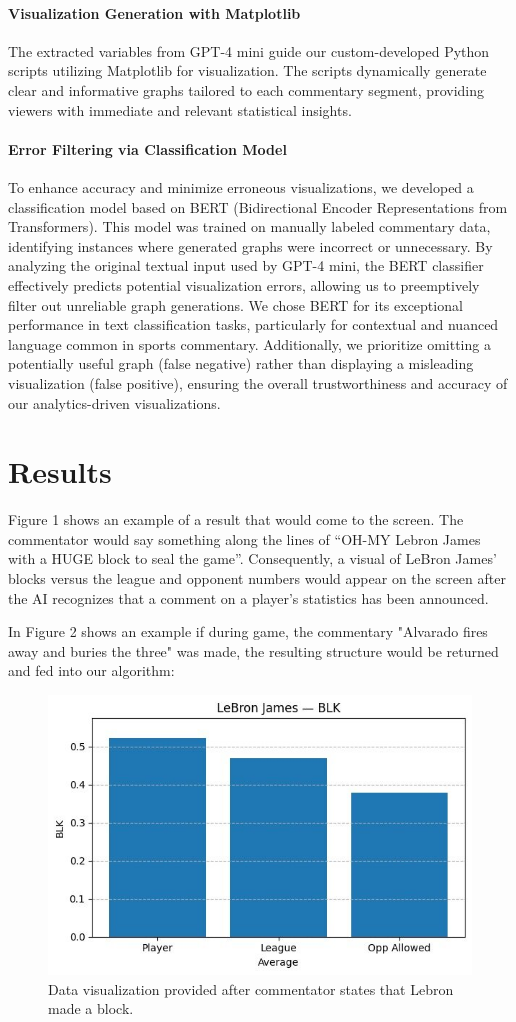 \documentclass{article}
\begin{document}
\paragraph{Visualization Generation with Matplotlib}
The extracted variables from GPT-4 mini guide our custom-developed Python scripts utilizing Matplotlib for visualization. The scripts dynamically generate clear and informative graphs tailored to each commentary segment, providing viewers with immediate and relevant statistical insights.

\paragraph{Error Filtering via Classification Model}
To enhance accuracy and minimize erroneous visualizations, we developed a classification model based on BERT (Bidirectional Encoder Representations from Transformers). This model was trained on manually labeled commentary data, identifying instances where generated graphs were incorrect or unnecessary. By analyzing the original textual input used by GPT-4 mini, the BERT classifier effectively predicts potential visualization errors, allowing us to preemptively filter out unreliable graph generations. We chose BERT for its exceptional performance in text classification tasks, particularly for contextual and nuanced language common in sports commentary. Additionally, we prioritize omitting a potentially useful graph (false negative) rather than displaying a misleading visualization (false positive), ensuring the overall trustworthiness and accuracy of our analytics-driven visualizations.

\section{Results}

Figure 1 shows  an example of a result that would come to the screen. The commentator would say something along the lines of “OH-MY Lebron James with a HUGE block to seal the game”. Consequently, a visual of LeBron James’ blocks versus the league and opponent numbers would appear on the screen after the AI recognizes that a comment on a player’s statistics has been announced.

In Figure 2 shows an example if during game, the commentary "Alvarado fires away and buries the three" was made, the resulting structure would be returned and fed into our algorithm:

\begin{figure}
    \centering
    \includegraphics[width=0.5\linewidth]{LebronJames.jpg}
    \caption{Data visualization provided after commentator states that Lebron made a block.}
    \label{fig:enter-label}
\end{figure}
\end{document}
